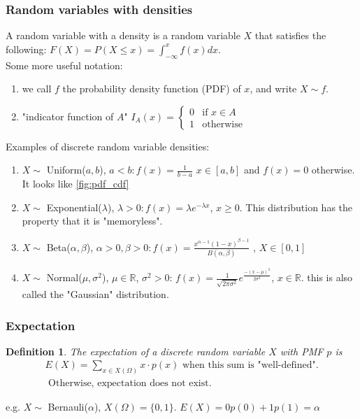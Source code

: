 \documentclass{article}
\newtheorem{definition}{Definition}
\newcommand{\R}{ \mathbb{R} }
\begin{document}
\subsubsection{Random variables with densities}
A random variable with a density is a random variable $X$ that satisfies the following: 
$F(X) = P(X \le x) = \int_{-\infty}^{x} f(x)dx$. \\
Some more useful notation: 
\begin{enumerate}
    \item we call $f$ the probability density function (PDF) of $x$, and write 
        $X \sim f$.
    \item "indicator function of $A$" $I_A(x) = \begin{cases} 0 & \text{if } x \in A \\ 1 & \text{otherwise} \end{cases}$
\end{enumerate}
Examples of discrete random variable densities: 
\begin{enumerate}
    \item $X \sim $ Uniform($a, b$),  $a < b : f(x) = \frac{1}{b-a}$ $x \in [a, b]$ and 
        $f(x) = 0$ otherwise. It looks like \ref{fig:pdf_cdf}
    \item $X \sim $ Exponential($\lambda$), $\lambda > 0 : f(x) = \lambda e^{-\lambda x}$, 
         $x \ge 0$. This distribution has the property that it is "memoryless".
    \item $X \sim $ Beta($\alpha, \beta$),  $\alpha > 0, \beta > 0 : f(x) = \frac{x^{\alpha-1}(1-x)^{\beta-1}}{B(\alpha, \beta)}$ , $X \in  [0,1]$
    \item $X \sim $ Normal($\mu, \sigma^2$), $\mu \in \R$,  $\sigma^2 > 0$: 
        $f(x) = \frac{1}{\sqrt{2\pi\sigma^2}}e^{\frac{-(x-\mu)^2}{2\sigma^2}}$, $x \in \R$.
        this is also called the "Gaussian" distribution.
\end{enumerate}


\subsubsection{Expectation}

\begin{definition}
    The expectation of a discrete random variable $X$ with PMF $p$ is 
    \begin{align*}
        E(X) = \sum_{x \in X(\Omega)} x \cdot p(x) \text{ when this sum is "well-defined".}\\
        \text{ Otherwise, expectation does not exist}
    .\end{align*}
\end{definition}
e.g. $X \sim $ Bernauli($\alpha$), $X(\Omega) = \{ 0, 1\}$. $E(X) = 0p(0) + 1p(1)=\alpha$
\end{document}
